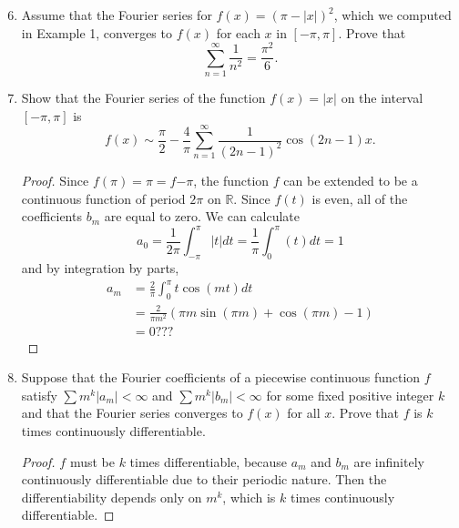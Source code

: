 \documentclass{article}
\begin{document}
\begin{enumerate}
      \setcounter{enumi}{5}
      \item Assume that the Fourier series for $f(x)=(\pi-\lvert x\rvert)^2$,
            which we computed in Example 1, converges to $f(x)$ for each $x$ in
            $[-\pi,\pi]$. Prove that
            \[
                  \sum_{n=1}^\infty\frac{1}{n^2}=\frac{\pi^2}{6}.
            \]
            \setcounter{enumi}{7}
      \item Show that the Fourier series of the function $f(x)=\lvert x\rvert$ on
            the interval $[-\pi,\pi]$ is
            \[
                  f(x) \sim \frac{\pi}{2}-\frac{4}{\pi}
                  \sum_{n=1}^\infty\frac{1}{(2n-1)^2}\cos(2n-1)x.
            \]
            \begin{proof}
                  Since $f(\pi)=\pi=f{-\pi}$, the function $f$ can be extended to be
                  a continuous function of period $2\pi$ on $\mathbb{R}$. Since $f(t)$
                  is even, all of the coefficients $b_m$ are equal to zero. We can
                  calculate
                  \[
                        a_0 = \frac{1}{2\pi}\int_{-\pi}^\pi |t|dt = \frac{1}{\pi}\int_0^\pi (t) dt = 1
                  \]
                  and by integration by parts,
                  \begin{align*}
                        a_m & = \frac{2}{\pi}\int_0^\pi t\cos (mt) dt                 \\
                            & = \frac{2}{\pi m^2}(\pi m\sin(\pi m) + \cos(\pi m) - 1) \\
                            & = 0 ???
                  \end{align*}
            \end{proof}
            \setcounter{enumi}{9}
      \item Suppose that the Fourier coefficients of a piecewise continuous function
            $f$ satisfy $\sum m^k\lvert a_m\rvert<\infty$ and
            $\sum m^k\lvert b_m\rvert<\infty$ for some fixed positive integer $k$
            and that the Fourier series converges to $f(x)$ for all $x$. Prove that
            $f$ is $k$ times continuously differentiable.
            \begin{proof}
                  $f$ must be $k$ times differentiable, because $a_m$ and $b_m$ are
                  infinitely continuously differentiable due to their periodic nature.
                  Then the differentiability depends only on $m^k$, which is $k$ times
                  continuously differentiable.
            \end{proof}
\end{enumerate}
\end{document}
